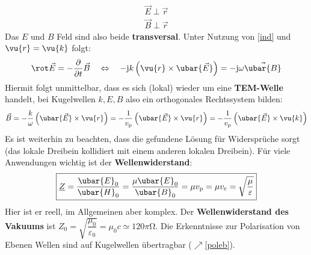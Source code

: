 		        \begin{equation}\begin{split}
				         \boxed{\vec{E} \perp \vec{r} }\\
				         \boxed{\vec{B}  \perp \vec{r} }
			        \end{split}\end{equation}
		  Das $E$ und $B$ Feld sind also beide \textbf{transversal}. Unter Nutzung von \ref{ind} und $\vu{r}=\vu{k}$ folgt:
		        \begin{equation}
			        \rot \vec{E} = -\dfrac{\partial}{\partial t}\vec{B}  \quad\Leftrightarrow \quad-\mathrm{j} k \left(\vu{r} \times \ubar{\vec{E}} \right) = -\mathrm{j}\omega \vec{\ubar{B}}
		        \end{equation}
		  Hiermit folgt unmittelbar, dass es sich (lokal) wieder um eine \textbf{TEM-Welle} handelt, bei Kugelwellen $k,E,B$ also ein orthogonales Rechtssystem bilden:
		        \begin{equation}
			        \vec{B}  = - \frac{ k}{\omega} \left(\ubar{\vec{E}} \times \vu{r} \right) = - \frac{1}{ v_\mathrm{p}} \left(\ubar{\vec{E}} \times \vu{r} \right) = - \frac{1}{ v_\mathrm{p}} \left(\ubar{\vec{E}} \times \vu{k} \right)
		        \end{equation}
		  Es ist weiterhin zu beachten, dass die gefundene Lösung für Widersprüche sorgt (das lokale Dreibein kollidiert mit einem anderen lokalen Dreibein). Für viele Anwendungen wichtig ist der \textbf{Wellenwiderstand}:
		        \begin{equation}
			        \boxed{\underline{Z} = \frac{\ubar{E}_0}{\ubar{H}_0} = \frac{\mu \ubar{E}_0}{\ubar{B}_0} = \mu v_\mathrm{p}  = \mu  v_\mathrm{c}= \sqrt{\frac{\mu}{\varepsilon}}} 
		        \end{equation}
		        Hier ist er reell, im Allgemeinen aber komplex. Der \textbf{Wellenwiderstand des Vakuums} ist \({Z_0 = \sqrt{\dfrac{\mu_0}{\varepsilon_0}} =\mu_0c\simeq 120\pi\mathrm{\Omega} }\). Die Erkenntnisse zur Polarisation von Ebenen Wellen sind auf Kugelwellen übertragbar ($\nearrow$\ref{poleb}).
